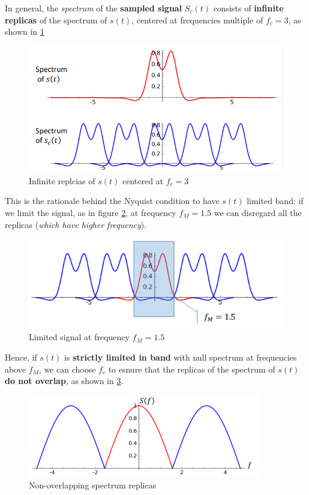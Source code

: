 \documentclass[10pt,a4paper]{report}
\theoremstyle{definition}
\begin{document}
In general, the \textit{spectrum} of the \textbf{sampled signal} $S_{c}(t)$ consists of \textbf{infinite replicas} of the spectrum of $s(t)$, centered at frequencies multiple of $f_{c}=3$, as shown in \ref{multiple-freq}
\begin{figure}[h]
	\centering
	\includegraphics[scale=0.50]{images/Pasted image 20230526120142.png}
	\caption{Infinite replcias of $s(t)$ centered at $f_{c}=3$}
	\label{multiple-freq}
\end{figure}

This is the rationale behind the Nyquist condition to have $s(t)$ limited band: if we limit the signal, as in figure \ref{limited-signal}, at frequency $f_{M} = 1.5$ we can disregard all the replicas (\textit{which have higher frequency}).
\begin{figure}[h!]
	\centering\includegraphics[scale=0.50]{images/Pasted image 20230526120124.png}
	\caption{Limited signal at frequency $f_{M} = 1.5$}
	\label{limited-signal}
\end{figure}


Hence, if $s(t)$ is \textbf{strictly limited in band} with null spectrum at frequencies above $f_{M}$, we can choose $f_{c}$ to esnure that the replicas of the spectrum of $s(t)$ \textbf{do not overlap}, as shown in \ref{non-overlap-spectrum}.
\begin{figure}[h!]
	\centering\includegraphics[scale=0.50]{images/Pasted image 20230526120312.png}
	\caption{Non-overlapping spectrum replicas}
	\label{non-overlap-spectrum}
\end{figure}
\end{document}
